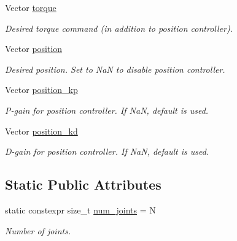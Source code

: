 \begin{DoxyCompactItemize}
\item 
\mbox{\label{structrobot__interfaces_1_1NJointAction_aab60be78c0008092bf3f36b92a25245d}} 
Vector \hyperlink{structrobot__interfaces_1_1NJointAction_aab60be78c0008092bf3f36b92a25245d}{torque}
\begin{DoxyCompactList}\small\item\em Desired torque command (in addition to position controller). \end{DoxyCompactList}\item 
\mbox{\label{structrobot__interfaces_1_1NJointAction_a1ba640ac58fef08cd8a5c964b7a4096f}} 
Vector \hyperlink{structrobot__interfaces_1_1NJointAction_a1ba640ac58fef08cd8a5c964b7a4096f}{position}
\begin{DoxyCompactList}\small\item\em Desired position. Set to NaN to disable position controller. \end{DoxyCompactList}\item 
\mbox{\label{structrobot__interfaces_1_1NJointAction_a4100b04d42c8e1d9b04ba141212c3461}} 
Vector \hyperlink{structrobot__interfaces_1_1NJointAction_a4100b04d42c8e1d9b04ba141212c3461}{position\+\_\+kp}
\begin{DoxyCompactList}\small\item\em P-\/gain for position controller. If NaN, default is used. \end{DoxyCompactList}\item 
\mbox{\label{structrobot__interfaces_1_1NJointAction_a652131480e656840e53f8709dae9c487}} 
Vector \hyperlink{structrobot__interfaces_1_1NJointAction_a652131480e656840e53f8709dae9c487}{position\+\_\+kd}
\begin{DoxyCompactList}\small\item\em D-\/gain for position controller. If NaN, default is used. \end{DoxyCompactList}\end{DoxyCompactItemize}
\subsection*{Static Public Attributes}
\begin{DoxyCompactItemize}
\item 
\mbox{\label{structrobot__interfaces_1_1NJointAction_a8d5a5328cfc71d1b892b2581e9b22723}} 
static constexpr size\+\_\+t \hyperlink{structrobot__interfaces_1_1NJointAction_a8d5a5328cfc71d1b892b2581e9b22723}{num\+\_\+joints} = N
\begin{DoxyCompactList}\small\item\em Number of joints. \end{DoxyCompactList}\end{DoxyCompactItemize}


